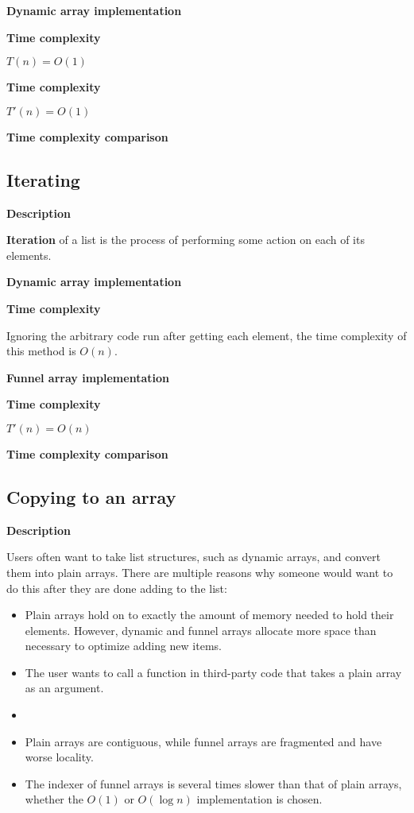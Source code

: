 \documentclass{article}
\newcommand{\descriptn}{\textbf{Description}}
\newcommand{\dynarrayimpl}{\textbf{Dynamic array implementation}}
\newcommand{\funarrayimpl}{\textbf{Funnel array implementation}}
\newcommand{\tcomplex}{\textbf{Time complexity}}
\newcommand{\tcomplexcmp}{\textbf{Time complexity comparison}}
\newcommand{\timefn}{T}
\newcommand{\timenewfn}{\timefn'}
\newcommand{\bigo}{O}
\newcommand{\varnitems}{n}
\begin{document}
	\dynarrayimpl
	
	\tcomplex
	
	$\timefn(\varnitems) = \bigo(1)$
	
	
	\tcomplex
	
	$\timenewfn(\varnitems) = \bigo(1)$
	
	\tcomplexcmp
	
	\subsection{Iterating}
	
	\descriptn
	
	\textbf{Iteration} of a list is the process of performing some action on each of its elements.
	
	\dynarrayimpl
	
	\tcomplex
	
	Ignoring the arbitrary code run after getting each element, the time complexity of this method is $\bigo(\varnitems)$.
	
	\funarrayimpl
	
	\tcomplex
	
	$\timenewfn(\varnitems) = \bigo(\varnitems)$
	
	\tcomplexcmp
	
	\subsection{Copying to an array}
	
	\descriptn
	
	Users often want to take list structures, such as dynamic arrays, and convert them into plain arrays. There are multiple reasons why someone would want to do this after they are done adding to the list:
	
	\begin{itemize}
		\item Plain arrays hold on to exactly the amount of memory needed to hold their elements. However, dynamic and funnel arrays allocate more space than necessary to optimize adding new items.
		\item The user wants to call a function in third-party code that takes a plain array as an argument.
		\item
		\item Plain arrays are contiguous, while funnel arrays are fragmented and have worse locality.
		\item The indexer of funnel arrays is several times slower than that of plain arrays, whether the $\bigo(1)$ or $\bigo(\log \varnitems)$ implementation is chosen.
	\end{itemize}
	
\end{document}
